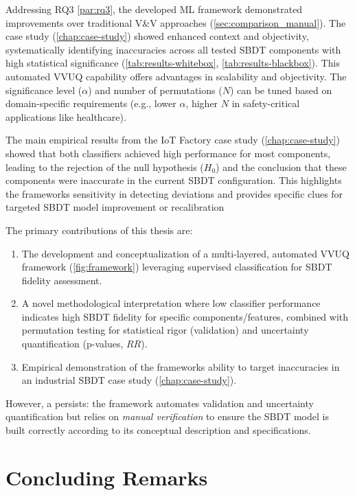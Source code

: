Addressing RQ3 \autoref{par:rq3}, the developed ML framework demonstrated improvements over traditional V\&V approaches (\autoref{sec:comparison_manual}). The case study (\autoref{chap:case-study}) showed enhanced context and objectivity, systematically identifying inaccuracies across all tested SBDT components with high statistical significance (\autoref{tab:results-whitebox}, \autoref{tab:results-blackbox}). This automated VVUQ capability offers advantages in scalability and objectivity. The significance level ($\alpha$) and number of permutations ($N$) can be tuned based on domain-specific requirements (e.g., lower $\alpha$, higher $N$ in safety-critical applications like healthcare).

The main empirical results from the IoT Factory case study (\autoref{chap:case-study}) showed that both classifiers achieved high performance for most components, leading to the rejection of the null hypothesis ($H_0$) and the conclusion that these components were inaccurate in the current SBDT configuration. This highlights the frameworks sensitivity in detecting deviations and provides specific clues for targeted SBDT model improvement or recalibration

The primary contributions of this thesis are:
\begin{enumerate}
  \item The development and conceptualization of a multi-layered, automated VVUQ framework (\autoref{fig:framework}) leveraging supervised classification for SBDT fidelity assessment.
  \item A novel methodological interpretation where low classifier performance indicates high SBDT fidelity for specific components/features, combined with permutation testing for statistical rigor (validation) and uncertainty quantification (p-values, $RR$).
  \item Empirical demonstration of the frameworks ability to target inaccuracies in an industrial SBDT case study (\autoref{chap:case-study}).
\end{enumerate}

However, a  persists: the framework automates validation and uncertainty quantification but relies on \textit{manual verification} to ensure the SBDT model is built correctly according to its conceptual description and specifications.

\section{Concluding Remarks}
\label{sec:conclusion_remarks}

